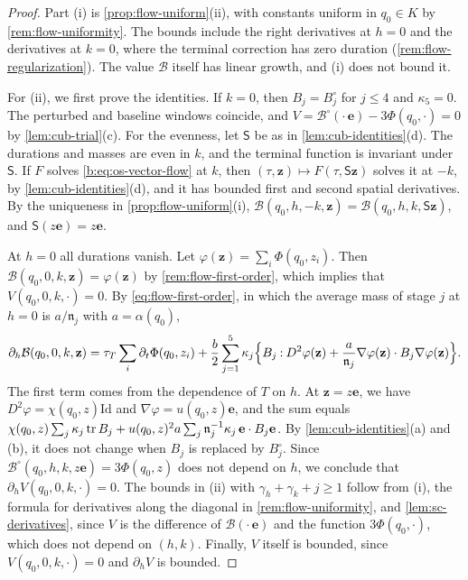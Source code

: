 \begin{proof}
Part (i) is \cref{prop:flow-uniform}(ii), with constants uniform in $q_0\in K$
by \cref{rem:flow-uniformity}. The bounds include the right derivatives
at $h=0$ and the derivatives at $k=0$, where the terminal correction has zero
duration (\cref{rem:flow-regularization}). The value $\mathcal B$ itself has
linear growth, and (i) does not bound it.

For (ii), we first prove the identities. If $k=0$, then $B_j=B_j^\circ$ for $j\le4$ and
$\kappa_5=0$. The perturbed and baseline windows coincide, and
$V=\mathcal B^\circ(\cdot\,\mathbf e)-3\Phi(q_0,\cdot)=0$ by
\cref{lem:cub-trial}(c). For the evenness, let $\mathsf S$ be as in
\cref{lem:cub-identities}(d). The durations and masses are even in $k$, and the
terminal function is invariant under $\mathsf S$. If $F$ solves
\eqref{b:eq:os-vector-flow} at $k$, then $(\tau,\mathbf z)\mapsto F(\tau,\mathsf
S\mathbf z)$ solves it at $-k$, by \cref{lem:cub-identities}(d), and it has bounded
first and second spatial derivatives. By the uniqueness in
\cref{prop:flow-uniform}(i), $\mathcal B(q_0,h,-k,\mathbf z)
=\mathcal B(q_0,h,k,\mathsf S\mathbf z)$, and $\mathsf S(z\mathbf e)=z\mathbf e$.

At $h=0$ all durations vanish. Let $\varphi(\mathbf z)=\sum_i\Phi(q_0,z_i)$. Then
$\mathcal B(q_0,0,k,\mathbf z)=\varphi(\mathbf z)$ by \cref{rem:flow-first-order},
which implies that $V(q_0,0,k,\cdot)=0$. By \eqref{eq:flow-first-order}, in which the average mass of
stage $j$ at $h=0$ is $a/\mathfrak n_j$ with $a=\alpha(q_0)$,
\[
 \partial_h\mathcal B(q_0,0,k,\mathbf z)
 =\tau_T\sum_i\partial_t\Phi(q_0,z_i)
 +\frac b2\sum_{j=1}^5\kappa_j\Bigl\{B_j\mathbin:D^2\varphi(\mathbf z)
 +\frac a{\mathfrak n_j}\nabla\varphi(\mathbf z)\cdot B_j\nabla\varphi(\mathbf z)\Bigr\}.
\]
The first term comes from the dependence of $T$ on $h$. At $\mathbf
z=z\mathbf e$, we have $D^2\varphi=\chi(q_0,z)\mathrm{Id}$ and $\nabla\varphi=u(q_0,z)\mathbf
e$, and the sum equals
$\chi(q_0,z)\sum_j\kappa_j\operatorname{tr} B_j+u(q_0,z)^2a\sum_j\mathfrak n_j^{-1}\kappa_j\,
\mathbf e\cdot B_j\mathbf e$. By \cref{lem:cub-identities}(a) and (b), it does
not change when $B_j$ is replaced by $B_j^\circ$. Since $\mathcal B^\circ(q_0,h,k,z\mathbf
e)=3\Phi(q_0,z)$ does not depend on $h$, we conclude that
$\partial_hV(q_0,0,k,\cdot)=0$. The bounds in (ii) with $\gamma_h+\gamma_k+j\ge1$ follow
from (i), the formula for derivatives along the diagonal in
\cref{rem:flow-uniformity}, and \cref{lem:sc-derivatives}, since $V$ is the difference of
$\mathcal B(\cdot\,\mathbf e)$ and the function $3\Phi(q_0,\cdot)$, which does
not depend on $(h,k)$. Finally, $V$ itself is bounded, since
$V(q_0,0,k,\cdot)=0$ and $\partial_hV$ is bounded.


\end{proof}
